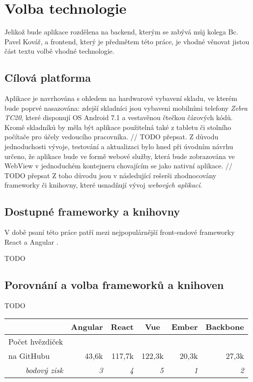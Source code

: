 \chapter{Volba technologie}\label{technology}

Jelikož bude aplikace rozdělena na backend, kterým se zabývá můj kolega Bc. Pavel Kovář, a frontend, který je předmětem této práce, je vhodné věnovat jistou část textu volbě vhodné technologie.

\section{Cílová platforma}

Aplikace je navrhována s ohledem na hardwarové vybavení skladu, ve kterém bude poprvé nasazována: zdejší skladníci jsou vybaveni mobilními telefony \emph{Zebra TC20}, které disponují OS Android 7.1 a vestavěnou čtečkou čárových kódů. Kromě skladníků by měla být aplikace použitelná také z tabletu či stolního počítače pro účely vedoucího pracovníka. // TODO přepsat. Z důvodu jednoduchosti vývoje,  testování a aktualizaci bylo hned při úvodním návrhu určeno, že aplikace bude ve formě webové služby, která bude zobrazována ve WebView v jednoduchém kontejneru chovajícím se jako nativní aplikace. // TODO přepsat
Z toho důvodu jsou v následující rešerši zhodnocovány frameworky či knihovny, které usnadňují vývoj \emph{webových aplikací}.

\section{Dostupné frameworky a knihovny}

V době psaní této práce patří mezi nejpopulárnější front-endové frameworky React \cite{react} a Angular \cite{angular}. 

TODO

\section{Porovnání a volba frameworků a knihoven}

TODO

\begin{table}[H]
\begin{tabular}{lrrrrr}
\hline
                                         & \multicolumn{1}{c}{Angular} & \multicolumn{1}{c}{React} & \multicolumn{1}{c}{Vue} & \multicolumn{1}{c}{Ember} & \multicolumn{1}{c}{Backbone} \\ \hline
Počet hvězdiček\\na GitHubu              & 43,6k                       & 117,7k                    & 122,3k                  & 20,3k                     & 27,3k                        \\
\multicolumn{1}{r}{\textit{bodový zisk}} & \textit{3}                  & \textit{4}                & \textit{5}              & \textit{1}                & \textit{2}                  
\end{tabular}
\end{table}

